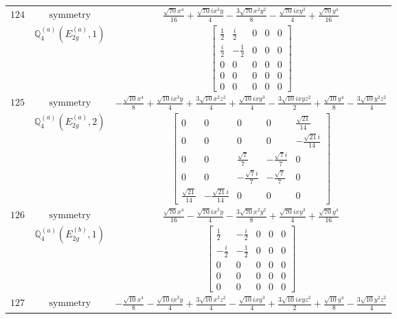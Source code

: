 \documentclass[fleqn,8pt,landscape]{jsarticle}
\begin{document}
\begin{longtable}{ccc}
$ 124 $ & $ \text{symmetry} $ & $ \frac{\sqrt{70} x^{4}}{16} + \frac{\sqrt{70} i x^{3} y}{4} - \frac{3 \sqrt{70} x^{2} y^{2}}{8} - \frac{\sqrt{70} i x y^{3}}{4} + \frac{\sqrt{70} y^{4}}{16} $ \\
$  $ & $ \mathbb{Q}_{4}^{(a)}(E_{2g}^{(a)},1) $ & $ \begin{bmatrix} \frac{1}{2} & \frac{i}{2} & 0 & 0 & 0 \\ \frac{i}{2} & - \frac{1}{2} & 0 & 0 & 0 \\ 0 & 0 & 0 & 0 & 0 \\ 0 & 0 & 0 & 0 & 0 \\ 0 & 0 & 0 & 0 & 0 \end{bmatrix} $ \\ \hline
$ 125 $ & $ \text{symmetry} $ & $ - \frac{\sqrt{10} x^{4}}{8} + \frac{\sqrt{10} i x^{3} y}{4} + \frac{3 \sqrt{10} x^{2} z^{2}}{4} + \frac{\sqrt{10} i x y^{3}}{4} - \frac{3 \sqrt{10} i x y z^{2}}{2} + \frac{\sqrt{10} y^{4}}{8} - \frac{3 \sqrt{10} y^{2} z^{2}}{4} $ \\
$  $ & $ \mathbb{Q}_{4}^{(a)}(E_{2g}^{(a)},2) $ & $ \begin{bmatrix} 0 & 0 & 0 & 0 & \frac{\sqrt{21}}{14} \\ 0 & 0 & 0 & 0 & - \frac{\sqrt{21} i}{14} \\ 0 & 0 & \frac{\sqrt{7}}{7} & - \frac{\sqrt{7} i}{7} & 0 \\ 0 & 0 & - \frac{\sqrt{7} i}{7} & - \frac{\sqrt{7}}{7} & 0 \\ \frac{\sqrt{21}}{14} & - \frac{\sqrt{21} i}{14} & 0 & 0 & 0 \end{bmatrix} $ \\ \hline
$ 126 $ & $ \text{symmetry} $ & $ \frac{\sqrt{70} x^{4}}{16} - \frac{\sqrt{70} i x^{3} y}{4} - \frac{3 \sqrt{70} x^{2} y^{2}}{8} + \frac{\sqrt{70} i x y^{3}}{4} + \frac{\sqrt{70} y^{4}}{16} $ \\
$  $ & $ \mathbb{Q}_{4}^{(a)}(E_{2g}^{(b)},1) $ & $ \begin{bmatrix} \frac{1}{2} & - \frac{i}{2} & 0 & 0 & 0 \\ - \frac{i}{2} & - \frac{1}{2} & 0 & 0 & 0 \\ 0 & 0 & 0 & 0 & 0 \\ 0 & 0 & 0 & 0 & 0 \\ 0 & 0 & 0 & 0 & 0 \end{bmatrix} $ \\ \hline
$ 127 $ & $ \text{symmetry} $ & $ - \frac{\sqrt{10} x^{4}}{8} - \frac{\sqrt{10} i x^{3} y}{4} + \frac{3 \sqrt{10} x^{2} z^{2}}{4} - \frac{\sqrt{10} i x y^{3}}{4} + \frac{3 \sqrt{10} i x y z^{2}}{2} + \frac{\sqrt{10} y^{4}}{8} - \frac{3 \sqrt{10} y^{2} z^{2}}{4} $ \\

\end{longtable}
\end{document}

